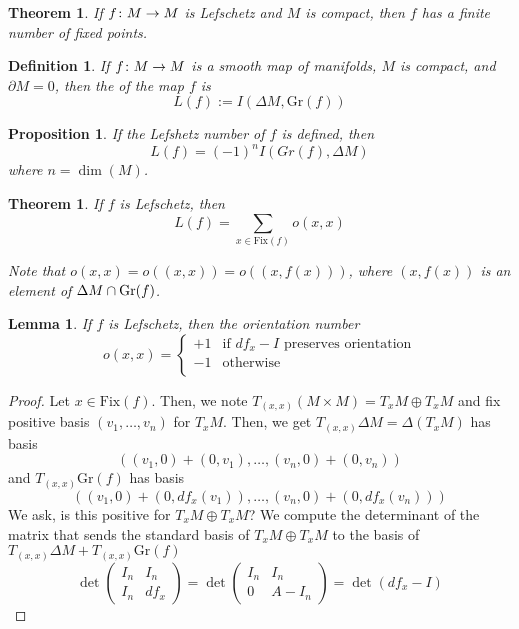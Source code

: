 \documentclass[11pt]{amsbook}
\theoremstyle{mystyle} %
\newtheorem{thrm}[thm]{Theorem}
\newtheorem{defi}[thm]{Definition}
\newtheorem{propo}[thm]{Proposition}
\newtheorem{lemm}[thm]{Lemma}
\numberwithin{thm}{section}
\newcommand{\Fix}{\text{Fix}}
\newcommand{\Gr}{\text{Gr}}
\renewcommand{\d}{\partial}
\begin{document}
\begin{thrm}
	If $f\colon M \to M$ is Lefschetz and $M$ is compact, then $f$ has a finite number of fixed points.
\end{thrm}
\begin{defi}
	If $f \colon M \to M$ is a smooth map of manifolds, $M$ is compact, and $\d M = 0$, then the  of the map $f$ is $$L(f) := I(\Delta M, \Gr(f))$$
\end{defi}
\begin{propo}
	If the Lefshetz number of $f$ is defined, then $$L(f) = (-1)^n I(Gr(f), \Delta M)$$ where $n = \dim(M)$.
\end{propo}
\begin{thrm}
	If $f$ is Lefschetz, then $$L(f) = \sum_{x \in \Fix(f)} o(x,x)$$

	Note that $o(x,x) = o((x,x)) = o((x,f(x)))$, where $(x, f(x))$ is an element of $\Delta M \intersect \Gr(f)$.
\end{thrm}

\begin{lemm}
	If $f$ is Lefschetz, then the orientation number
	$$o(x,x) =
	\begin{cases}
		+1 &\text{if $df_x - I$ preserves orientation} \\
		-1 &\text{otherwise} \\
	\end{cases}$$
\end{lemm}
\begin{proof}
  Let \(x \in \Fix(f)\). Then, we note \(T_{(x,x)}(M \times M) = T_x M
  \oplus T_x M\) and fix positive basis \((v_1, \ldots, v_n)\) for
  \(T_x M\). Then, we get \(T_{(x,x)} \Delta M = \Delta(T_x M)\) has
  basis \[
    \left( (v_1,0) + (0,v_1), \ldots, (v_n,0) + (0,v_n)\right)
  \]
  and \(T_{(x,x)} \Gr(f)\) has basis \[
    \left( (v_1,0) + (0,df_x(v_1)), \ldots, (v_n,0)+(0,df_x(v_n)) \right)
  \]
  We ask, is this positive for \(T_x M \oplus T_x M\)? We compute the
  determinant of the
  matrix that sends the standard basis of \(T_x M \oplus T_x M\) to
  the basis of \(T_{(x,x)} \Delta M + T_{(x,x)} \Gr(f)\) \[
    \det \left(
      \begin{array}{cc}
        I_n & I_n \\
        I_n & df_x
      \end{array}
\right) = \det \left(
  \begin{array}{cc}
    I_n & I_n \\
    0 & A-I_n
  \end{array}
\right) = \det(df_x - I)
  \]
\end{proof}
\end{document}
